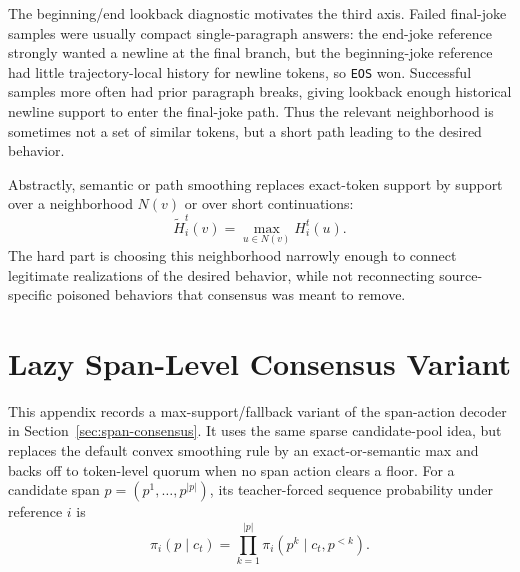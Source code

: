 \documentclass[11pt]{article}
\begin{document}
The beginning/end lookback diagnostic motivates the third axis. Failed final-joke samples were usually compact single-paragraph answers: the end-joke reference strongly wanted a newline at the final branch, but the beginning-joke reference had little trajectory-local history for newline tokens, so \texttt{EOS} won. Successful samples more often had prior paragraph breaks, giving lookback enough historical newline support to enter the final-joke path. Thus the relevant neighborhood is sometimes not a set of similar tokens, but a short path leading to the desired behavior.

Abstractly, semantic or path smoothing replaces exact-token support by support over a neighborhood $N(v)$ or over short continuations:
\[
\widetilde H_i^t(v)=\max_{u\in N(v)}H_i^t(u).
\]
The hard part is choosing this neighborhood narrowly enough to connect legitimate realizations of the desired behavior, while not reconnecting source-specific poisoned behaviors that consensus was meant to remove.

\newpage
\section{Lazy Span-Level Consensus Variant}
\label{app:lazy-span}

This appendix records a max-support/fallback variant of the span-action decoder in Section~\ref{sec:span-consensus}. It uses the same sparse candidate-pool idea, but replaces the default convex smoothing rule by an exact-or-semantic max and backs off to token-level quorum when no span action clears a floor. For a candidate span $p=(p^1,\dots,p^{|p|})$, its teacher-forced sequence probability under reference $i$ is
\[
\pi_i(p\mid c_t)=\prod_{k=1}^{|p|}\pi_i(p^k\mid c_t,p^{<k}).
\]
\end{document}
